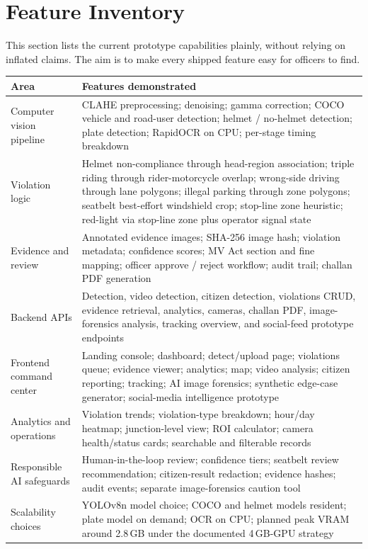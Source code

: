 \documentclass[11pt,a4paper]{article}
\newcommand{\sectionrule}{\noindent{\color{vigilaccent}\rule{0.22\linewidth}{2.2pt}}{\color{vigilaccent!30}\rule{0.78\linewidth}{0.6pt}}\par\vspace{4pt}}
\begin{document}
\section{Feature Inventory}
\sectionrule

This section lists the current prototype capabilities plainly, without relying on inflated claims. The aim is to make every shipped feature easy for officers to find.

\begin{longtable}{@{}p{3.3cm}p{8.8cm}@{}}
\hline
\textbf{Area} & \textbf{Features demonstrated} \\
\hline
Computer vision pipeline & CLAHE preprocessing; denoising; gamma correction; COCO vehicle and road-user detection; helmet / no-helmet detection; plate detection; RapidOCR on CPU; per-stage timing breakdown \\
Violation logic & Helmet non-compliance through head-region association; triple riding through rider-motorcycle overlap; wrong-side driving through lane polygons; illegal parking through zone polygons; seatbelt best-effort windshield crop; stop-line zone heuristic; red-light via stop-line zone plus operator signal state \\
Evidence and review & Annotated evidence images; SHA-256 image hash; violation metadata; confidence scores; MV Act section and fine mapping; officer approve / reject workflow; audit trail; challan PDF generation \\
Backend APIs & Detection, video detection, citizen detection, violations CRUD, evidence retrieval, analytics, cameras, challan PDF, image-forensics analysis, tracking overview, and social-feed prototype endpoints \\
Frontend command center & Landing console; dashboard; detect/upload page; violations queue; evidence viewer; analytics; map; video analysis; citizen reporting; tracking; AI image forensics; synthetic edge-case generator; social-media intelligence prototype \\
Analytics and operations & Violation trends; violation-type breakdown; hour/day heatmap; junction-level view; ROI calculator; camera health/status cards; searchable and filterable records \\
Responsible AI safeguards & Human-in-the-loop review; confidence tiers; seatbelt review recommendation; citizen-result redaction; evidence hashes; audit events; separate image-forensics caution tool \\
Scalability choices & YOLOv8n model choice; COCO and helmet models resident; plate model on demand; OCR on CPU; planned peak VRAM around 2.8\,GB under the documented 4\,GB-GPU strategy \\
\hline
\end{longtable}
\end{document}
